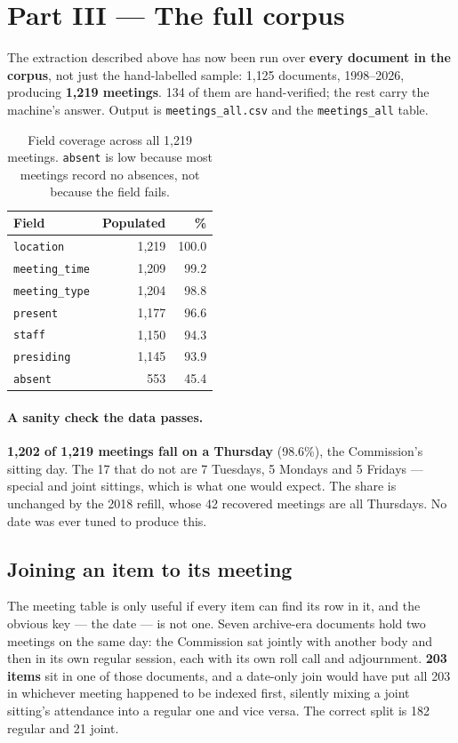 \documentclass[11pt]{article}
\begin{document}
\section{Part III --- The full corpus}

The extraction described above has now been run over \textbf{every document in the corpus},
not just the hand-labelled sample: 1{,}125 documents, 1998--2026, producing
\textbf{1{,}219 meetings}. 134 of them are hand-verified; the rest carry the machine's
answer. Output is \texttt{meetings\_all.csv} and the \texttt{meetings\_all} table.

\begin{table}[h]
\centering
\begin{tabular}{lrr}
\toprule
Field & Populated & \% \\
\midrule
\texttt{location}      & 1{,}219 & 100.0 \\
\texttt{meeting\_time} & 1{,}209 &  99.2 \\
\texttt{meeting\_type} & 1{,}204 &  98.8 \\
\texttt{present}       & 1{,}177 &  96.6 \\
\texttt{staff}         & 1{,}150 &  94.3 \\
\texttt{presiding}     & 1{,}145 &  93.9 \\
\texttt{absent}        &   553 &  45.4 \\
\bottomrule
\end{tabular}
\caption{Field coverage across all 1{,}219 meetings. \texttt{absent} is low because most
meetings record no absences, not because the field fails.}
\end{table}

\paragraph{A sanity check the data passes.} \textbf{1{,}202 of 1{,}219 meetings fall on a
Thursday} (98.6\%), the Commission's sitting day. The 17 that do not are 7 Tuesdays, 5
Mondays and 5 Fridays --- special and joint sittings, which is what one would expect. The
share is unchanged by the 2018 refill, whose 42 recovered meetings are all Thursdays. No
date was ever tuned to produce this.

\subsection{Joining an item to its meeting}

The meeting table is only useful if every item can find its row in it, and the obvious key
--- the date --- is not one. Seven archive-era documents hold two meetings on the same day:
the Commission sat jointly with another body and then in its own regular session, each with
its own roll call and adjournment. \textbf{203 items} sit in one of those documents, and a
date-only join would have put all 203 in whichever meeting happened to be indexed first,
silently mixing a joint sitting's attendance into a regular one and vice versa. The correct
split is 182 regular and 21 joint.
\end{document}
